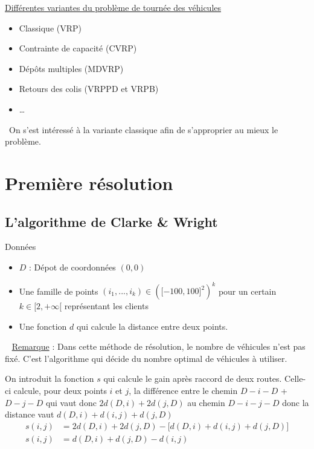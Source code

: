 \documentclass[10pt]{beamer}
\begin{document}
	\begin{frame}
		\underline{Différentes variantes du problème de tournée des véhicules}
		\begin{itemize}[label=—]
			\item Classique (VRP) \pause
			\item Contrainte de capacité (CVRP) \pause
			\item Dépôts multiples (MDVRP) \pause
			\item Retours des colis (VRPPD et VRPB) \pause
			\item \dots \pause
		\end{itemize}
		\ \newline On s'est intéressé à la variante classique afin de s'approprier au mieux le problème.
	\end{frame}
	
	\section{Première résolution}

	\subsection{L'algorithme de Clarke \& Wright}

	\begin{frame}
		\begin{beamerboxesrounded}[upper=data_up,lower=data_low,shadow=true]{Données} \pause
			\begin{itemize}[label=-]
				\item $D$ : Dépot de coordonnées $(0,0)$\pause
				\item Une famille de points \((i_1,...,i_k) \in {(\lbrack-100,100\rbrack^2)}^k\) pour un certain $k \in \lbrack2,+\infty\lbrack$ représentant les clients\pause
				\item Une fonction $d$ qui calcule la distance entre deux points. \pause
			\end{itemize}
		\end{beamerboxesrounded}\ \newline
		\underline{Remarque} : Dans cette méthode de résolution, le nombre de véhicules n'est pas fixé. C'est l'algorithme qui décide du nombre optimal de véhicules à utiliser. 
	\end{frame}
	 
	\begin{frame}	
		\begin{definition}
			On introduit la fonction $s$ qui calcule le gain après raccord de deux routes. Celle-ci calcule, pour deux points $i$ et $j$, la différence entre le chemin $D-i-D$ + $D-j-D$ qui vaut donc $2d(D,i) + 2d(j,D)$ au chemin $D-i-j-D$ donc la distance vaut $d(D,i) + d(i,j) + d(j,D)$
		\begin{align*}
			s(i,j) &= 2d(D,i) + 2d(j,D) - \lbrack d(D,i) + d(i,j) + d(j,D)\rbrack \\
			s(i,j) &= d(D,i) + d(j,D) - d(i,j)
		\end{align*}		
		\end{definition}
	\end{frame}
\end{document}

